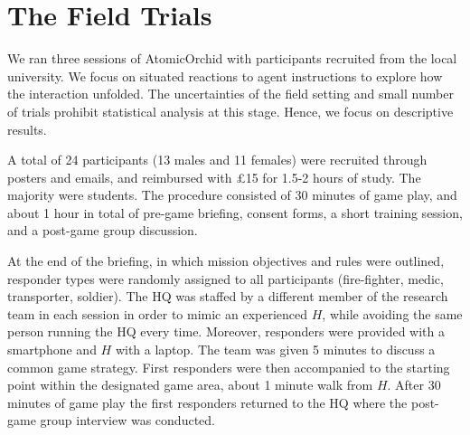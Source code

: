 \section{The Field Trials}\label{sec:evaluation}
\noindent We ran three sessions of AtomicOrchid with participants recruited from the local university. We focus on situated reactions to agent instructions to explore how the interaction unfolded. The uncertainties of the field setting and small number of trials prohibit statistical analysis at this stage. Hence, we focus on descriptive results. 

A total of 24 participants (13 males and 11 females) were recruited through posters and emails, and reimbursed with \pounds 15  for 1.5-2 hours of study. The majority were students. The procedure consisted of 30 minutes of game play, and about 1 hour in total of pre-game briefing, consent forms,  a short training session, and a post-game group discussion. 


At the end of the briefing, in which mission objectives and rules were outlined, responder types were randomly assigned to all participants (fire-fighter, medic, transporter, soldier). The HQ was staffed by a different member of the research team in each session in order to mimic an experienced $H$, while avoiding the same person running the HQ every time.  Moreover, responders were provided with a smartphone and $H$ with a laptop. The team was given 5 minutes to discuss a common game strategy.  First responders were then accompanied to the starting point within the designated game area, about 1 minute walk from $H$. After 30 minutes of game play the first responders returned to the HQ where the post-game group interview was conducted.

